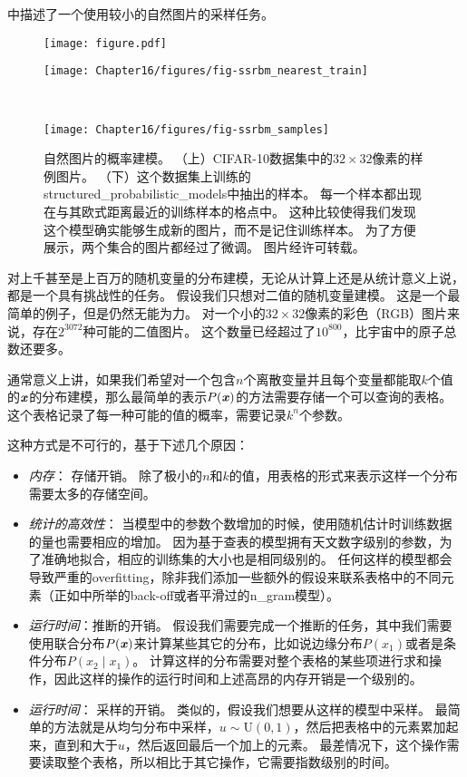中描述了一个使用较小的自然图片的采样任务。

\begin{figure}[!htb]
\ifOpenSource
\centerline{\texttt{[image: figure.pdf]}}
\else
	\centerline{\texttt{[image: Chapter16/figures/fig-ssrbm\_nearest\_train]}}\ \\
     \centerline{\texttt{[image: Chapter16/figures/fig-ssrbm\_samples]}}
\fi
	\caption{自然图片的概率建模。
（上）CIFAR-10数据集\citep{KrizhevskyHinton2009}中的$32\times 32$像素的样例图片。
（下）这个数据集上训练的\gls{structured_probabilistic_models}中抽出的样本。
每一个样本都出现在与其欧式距离最近的训练样本的格点中。
这种比较使得我们发现这个模型确实能够生成新的图片，而不是记住训练样本。
为了方便展示，两个集合的图片都经过了微调。
图片经\citet{Courville+al-2011-small}许可转载。}
	\label{fig:chap16_fig-ssrbm}
\end{figure}

对上千甚至是上百万的随机变量的分布建模，无论从计算上还是从统计意义上说，都是一个具有挑战性的任务。
假设我们只想对二值的随机变量建模。
这是一个最简单的例子，但是仍然无能为力。
对一个小的$32\times 32$像素的彩色（RGB）图片来说，存在$2^{3072}$种可能的二值图片。
这个数量已经超过了$10^{800}$，比宇宙中的原子总数还要多。

通常意义上讲，如果我们希望对一个包含$n$个离散变量并且每个变量都能取$k$个值的$\boldsymbol{\mathit{x}}$的分布建模，那么最简单的表示$P(\boldsymbol{\mathit{x}})$的方法需要存储一个可以查询的表格。
这个表格记录了每一种可能的值的概率，需要记录$k^n$个参数。

这种方式是不可行的，基于下述几个原因：
\begin{itemize}
	\item \emph{内存}： 存储开销。
	除了极小的$n$和$k$的值，用表格的形式来表示这样一个分布需要太多的存储空间。
	
	\item  \emph{统计的高效性}： 当模型中的参数个数增加的时候，使用随机估计时训练数据的量也需要相应的增加。
	因为基于查表的模型拥有天文数字级别的参数，为了准确地拟合，相应的训练集的大小也是相同级别的。
	任何这样的模型都会导致严重的\gls{overfitting}，除非我们添加一些额外的假设来联系表格中的不同元素（正如中所举的back-off或者平滑过的\gls{n_gram}模型）。
	
	\item \emph{运行时间}：推断的开销。
	假设我们需要完成一个推断的任务，其中我们需要使用联合分布$P(\boldsymbol{\mathit{x}})$来计算某些其它的分布，比如说边缘分布$P(x_1)$或者是条件分布$P(x_2\mid x_1)$。
	计算这样的分布需要对整个表格的某些项进行求和操作，因此这样的操作的运行时间和上述高昂的内存开销是一个级别的。
	
	
	\item \emph{运行时间}： 采样的开销。
	类似的，假设我们想要从这样的模型中采样。
	最简单的方法就是从均匀分布中采样，$u\sim \text{U}(0,1)$，然后把表格中的元素累加起来，直到和大于$u$，然后返回最后一个加上的元素。
	最差情况下，这个操作需要读取整个表格，所以相比于其它操作，它需要指数级别的时间。
\end{itemize}



